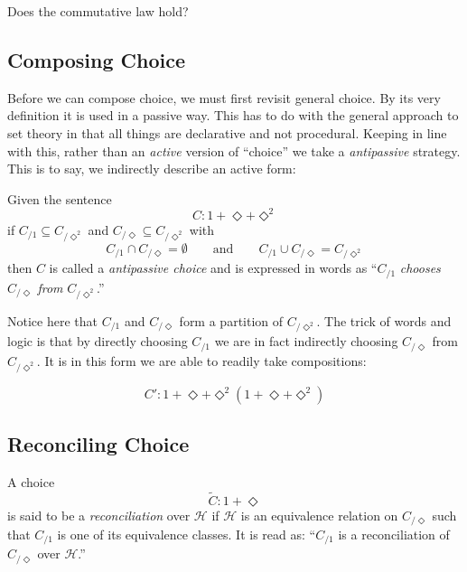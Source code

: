 \documentclass[twoside]{book}
\newcommand{\pass}[1][\Diamond]{\ensuremath{{_{\!/{#1}}}}}
\newcommand{\passes}[2][\Diamond]{\ensuremath{{_{\!/{#1}^{#2}}}}}
\newcommand{\syntax}[1][\Diamond]{\ensuremath{1+{#1}}}
\newcommand{\syntaxes}[1][\Diamond]{\ensuremath{1+{#1}+{#1}^2}}
\newenvironment{definition}[1][Definition]{\begin{trivlist}
\item[\hskip \labelsep {\bfseries Definition (#1):}]}{\end{trivlist}}
\begin{document}
Does the commutative law hold?

\subsection{Composing Choice}

Before we can compose choice, we must first revisit general choice.  By its very definition it is used in a
passive way.  This has to do with the general approach to set theory in that all things are declarative and
not procedural.  Keeping in line with this, rather than an \emph{active} version of ``choice'' we take a
\emph{antipassive} strategy.  This is to say, we indirectly describe an active form:

\begin{definition}[\hypertarget{AntipassiveChoice}{\hyperlink{oAntipassiveChoice}{Antipassive Choice}}]

Given the sentence
$$ C:\syntaxes $$
if $ C\pass[1]\subseteq C\passes{2} $ and  $ C\pass\subseteq C\passes{2} $ with
$$ C\pass[1]\cap C\pass=\emptyset\qquad\mbox{and}\qquad C\pass[1]\cup C\pass=C\passes{2} $$
then $ C $ is called a \emph{antipassive choice} and is expressed in words as
``$ C\pass[1] $ \emph{chooses} $ C\pass $ \emph{from} $ C\passes{2} $.''

\end{definition}

Notice here that $ C\pass[1] $ and $ C\pass $ form a partition of $ C\passes{2} $.
The trick of words and logic is that by directly choosing $ C\pass[1] $ we are in fact
indirectly choosing $ C\pass $ from $ C\passes{2} $.  It is in this
form we are able to readily take compositions:

$$ C':\syntaxes(\syntaxes) $$

\subsection{Reconciling Choice}

\begin{definition}[\hypertarget{Reconciliation}{\hyperlink{oReconciliation}{Reconciliation}}]

A choice
$$ \tilde{C}:\syntax $$
is said to be a \emph{reconciliation} over $ \mathcal{H} $ if $ \mathcal{H} $ is an
equivalence relation on $ C\pass $ such that $ C\pass[1] $ is one of its equivalence classes.
It is read as: ``$ C\pass[1] $ is a reconciliation of $ C\pass $ over $ \mathcal{H} $.''

\end{definition}
\end{document}
